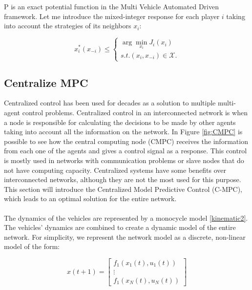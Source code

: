 P is an exact potential function in the Multi Vehicle Automated Driven \cite{20t_article} framework. Let me introduce the mixed-integer response for each player $i$ taking into account the strategies of its neighbors $x_i$:

\begin{equation}
    x^*_i (x_{-i}) \leq  \left\{ \begin{array}{cl}
\arg\min_{x_i} {J_i}(x_i) \\ 
s.t. (x_i, x_{-i}) \in \mathcal{X}.
\end{array} \right.
\end{equation}



\subsection{Centralize MPC}
\label{subsec:centr}
Centralized control has been used for decades as a solution to multiple multi-agent control problems. Centralized control in an interconnected network is when a node is responsible for calculating the decisions to be made by other agents taking into account all the information on the network. In Figure \ref{fig:CMPC} is possible to see how the central computing node (CMPC) receives the information from each one of the agents and gives a control signal as a response. This control is mostly used in networks with communication problems or slave nodes that do not have computing capacity. Centralized systems have some benefits over interconnected networks, although they are not the most used for this purpose. This section will introduce the Centralized Model Predictive Control (C-MPC), which leads to an optimal solution for the entire network.
\\
\\
The dynamics of the vehicles are represented by a monocycle model \ref{kinematic2}. The vehicles' dynamics are combined to create a dynamic model of the entire network. For simplicity, we represent the network model as a discrete, non-linear model of the form:


\begin{equation}
    x(t+1) = \begin{bmatrix}
f_1(x_1(t),u_1(t))\\ 
\vdots  \\
f_1(x_N(t),u_N(t))
\end{bmatrix}
\end{equation}

